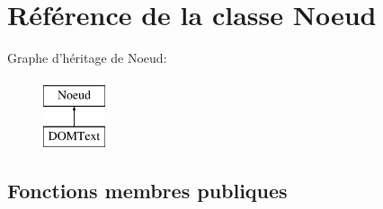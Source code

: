 \hypertarget{classNoeud}{
\section{Référence de la classe Noeud}
\label{classNoeud}
}
Graphe d'héritage de Noeud:\begin{figure}[H]
\begin{center}
\leavevmode
\includegraphics[height=2.000000cm]{classNoeud}
\end{center}
\end{figure}
\subsection*{Fonctions membres publiques}
